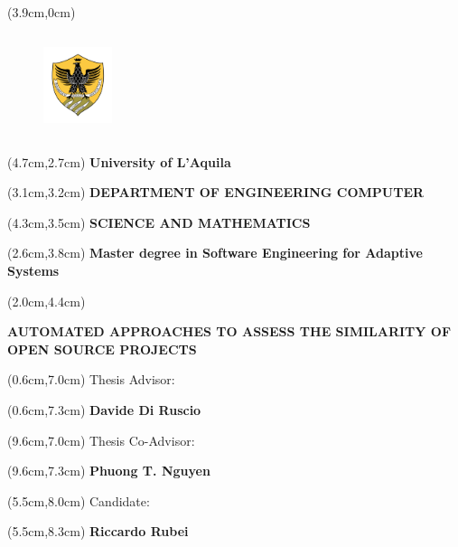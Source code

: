 \documentclass{beamer}
\begin{document}
\begin{frame}%
\begin{textblock*}{5cm}(3.9cm,0cm)
	\begin{figure}[!h]
	\includegraphics[width=2cm,height=3cm,keepaspectratio]{images/Logo.png}
	\centering
	\label{fig:Logo}
	\end{figure}
\end{textblock*}

\begin{textblock*}{5cm}(4.7cm,2.7cm)
\textbf{\small University of L'Aquila}
\end{textblock*}

\begin{textblock*}{10cm}(3.1cm,3.2cm)
\textbf{\scriptsize DEPARTMENT OF ENGINEERING COMPUTER}
\end{textblock*}

\begin{textblock*}{10cm}(4.3cm,3.5cm)
\textbf{\scriptsize SCIENCE AND MATHEMATICS}
\end{textblock*}

\begin{textblock*}{10cm}(2.6cm,3.8cm)
\textbf{\scriptsize Master degree in Software Engineering for Adaptive Systems}
\end{textblock*}

\begin{textblock*}{9cm}(2.0cm,4.4cm)
\begin{center}
\textbf{\scriptsize AUTOMATED APPROACHES TO ASSESS THE SIMILARITY
OF OPEN SOURCE PROJECTS}
\end{center}
\end{textblock*}

\begin{textblock*}{2cm}(0.6cm,7.0cm)
\scriptsize Thesis Advisor:
\end{textblock*}
\begin{textblock*}{5cm}(0.6cm,7.3cm)
\textbf{\scriptsize Davide Di Ruscio}
\end{textblock*}

\begin{textblock*}{2.5cm}(9.6cm,7.0cm)
\scriptsize Thesis Co-Advisor:
\end{textblock*}
\begin{textblock*}{5cm}(9.6cm,7.3cm)
\textbf{\scriptsize Phuong T. Nguyen}
\end{textblock*}

\begin{textblock*}{2.5cm}(5.5cm,8.0cm)
\scriptsize Candidate:
\end{textblock*}
\begin{textblock*}{5cm}(5.5cm,8.3cm)
\textbf{\scriptsize Riccardo Rubei}
\end{textblock*}

\end{frame}
\end{document}
